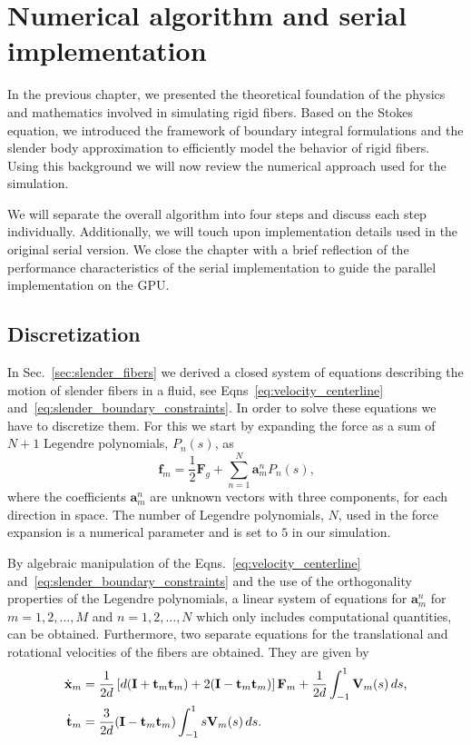 \chapter{Numerical algorithm and serial implementation}
\label{cha:serial_implementation}

In the previous chapter, we presented the theoretical foundation of the physics and mathematics involved in simulating rigid fibers. Based on the Stokes equation, we introduced the framework of boundary integral formulations and the slender body approximation to efficiently model the behavior of rigid fibers. Using this background we will now review the numerical approach used for the simulation.

We will separate the overall algorithm into four steps and discuss each step individually. Additionally, we will touch upon implementation details used in the original serial version. We close the chapter with a brief reflection of the performance characteristics of the serial implementation to guide the parallel implementation on the GPU.

\section{Discretization}
\label{sec:serial_discretization}
In Sec.~\ref{sec:slender_fibers} we derived a closed system of equations describing the motion of slender fibers in a fluid, see Eqns~\eqref{eq:velocity_centerline} and~\eqref{eq:slender_boundary_constraints}. In order to solve these equations we have to discretize them. For this we start by expanding the force as a sum of $N+1$ Legendre polynomials, $P_n(s)$, as
\begin{equation}
  \label{eq:force_discretization}
  \mathbf{f}_m = \frac{1}{2}\mathbf{F}_g + \sum_{n=1}^{N}\mathbf{a}_{m}^{n} P_n(s) \text{,}
\end{equation}
where the coefficients $\mathbf{a}_m^n$ are unknown vectors with three components, for each direction in space. The number of Legendre polynomials, $N$, used in the force expansion is a numerical parameter and is set to $5$ in our simulation.

By algebraic manipulation of the Eqns.~\eqref{eq:velocity_centerline} and~\eqref{eq:slender_boundary_constraints} and the use of the orthogonality properties of the Legendre polynomials, a linear system of equations for $\mathbf{a}_m^n$ for $m=1,2,\dots,M$ and $n=1,2,\dots,N$ which only includes computational quantities, can be obtained. Furthermore, two separate equations for the translational and rotational velocities of the fibers are obtained. They are given by
\begin{align}
	\dot{\mathbf{x}}_m &= \frac{1}{2d}\left[d(\mathbf{I}+\mathbf{t}_m\mathbf{t}_m) + 2(\mathbf{I}-\mathbf{t}_m\mathbf{t}_m)\right] \mathbf{F}_m + \frac{1}{2d} \int_{-1}^{1} \mathbf{V}_m(s) \, ds \text{,} \label{eq:delta_translate_velocity} \\
	\dot{\mathbf{t}}_m &= \frac{3}{2d}(\mathbf{I}-\mathbf{t}_m\mathbf{t}_m) \int_{-1}^{1}s\mathbf{V}_m(s) \, ds \text{.}\label{eq:delta_rotate_velocity}
\end{align}


